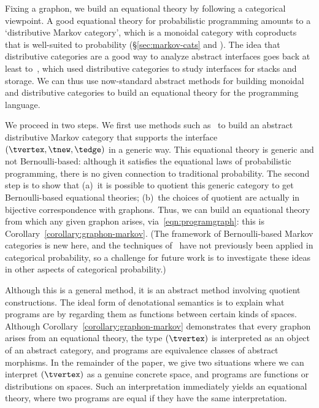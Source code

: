 Fixing a graphon, we build an equational theory by following a
categorical viewpoint. A good equational theory for probabilistic
programming amounts to a `distributive Markov category', which is a
monoidal category with coproducts that is well-suited to probability
(\S\ref{sec:markov-cats} and \cite{fritz}). The idea that distributive categories
are a good way to analyze abstract interfaces goes back at least
to~\cite{walters}, which used distributive categories to study
interfaces for stacks and storage. 
We can thus use now-standard abstract methods for building monoidal and
distributive categories to build an equational theory for the
programming language.

We proceed in two steps. We first use methods such as~\cite{hermida-tennent,hu-tholen}
to build an abstract distributive
Markov category that supports the interface
$(\tvertex,\tnew,\tedge)$ in a generic way. This equational theory is
generic and not Bernoulli-based: although it satisfies the equational laws of
probabilistic programming, there is no given connection to traditional probability.
The second step is to  show that (a)~it is possible to quotient this generic category
to get Bernoulli-based equational theories; (b)~the choices of
quotient are actually in bijective correspondence with graphons.
Thus, we can build an equational theory from which any given graphon arises,
via~\eqref{eqn:programgraph}: this is Corollary~\ref{corollary:graphon-markov}.
(The framework of Bernoulli-based Markov categories is new here, and the techniques of~\cite{hermida-tennent,hu-tholen}  have not previously been applied in categorical probability, so
a challenge for future work is to investigate these ideas in other aspects of categorical probability.)

Although this is a general method,
it is an abstract method involving quotient constructions. 
The ideal form of denotational semantics is to explain what programs are by regarding them as
functions between certain kinds of spaces. Although Corollary~\ref{corollary:graphon-markov} demonstrates
that every graphon arises from an equational theory, the type
$(\tvertex)$ is interpreted as an object of an abstract category, and
programs are equivalence classes of abstract morphisms.
In the remainder of the paper, we give two situations where we can
interpret $(\tvertex)$ as a genuine concrete space, and programs are
functions or distributions on spaces. Such an interpretation
immediately yields an equational theory, where two programs are
equal if they have the same interpretation.

